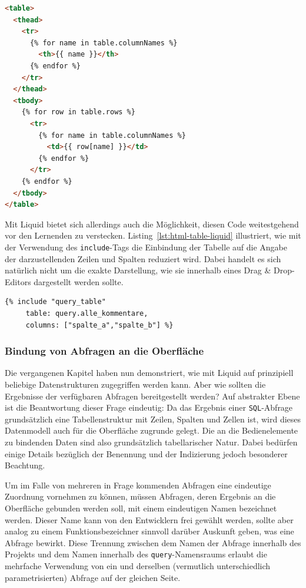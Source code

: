 \begin{lstlisting}[language=html,float=h,caption={Code für eine \texttt{HTML}-Tabelle mit Datenanbindung}, label={lst:html-table-pure}]
<table>
  <thead>
    <tr>
      {% for name in table.columnNames %}
        <th>{{ name }}</th>
      {% endfor %}
    </tr>
  </thead>
  <tbody>
    {% for row in table.rows %}
      <tr>
        {% for name in table.columnNames %}
          <td>{{ row[name] }}</td>
        {% endfor %}
      </tr>
    {% endfor %}
  </tbody>
</table>
\end{lstlisting}

Mit Liquid bietet sich allerdings auch die Möglichkeit, diesen Code weitestgehend vor den Lernenden zu verstecken. Listing~\ref{lst:html-table-liquid} illustriert, wie mit der Verwendung des \texttt{include}-Tags die Einbindung der Tabelle auf die Angabe der darzustellenden Zeilen und Spalten reduziert wird. Dabei handelt es sich natürlich nicht um die exakte Darstellung, wie sie innerhalb eines Drag \& Drop-Editors dargestellt werden sollte.

\begin{lstlisting}[language=html,float=h,caption={Code für eine Liquid-Tabelle mit Datenanbindung}, label={lst:html-table-liquid}]
{% include "query_table" 
     table: query.alle_kommentare,
     columns: ["spalte_a","spalte_b"] %}
\end{lstlisting}

\subsubsection{Bindung von Abfragen an die Oberfläche}
\label{sec:design-ui-bind-output}

Die vergangenen Kapitel haben nun demonstriert, wie mit Liquid auf prinzipiell beliebige Datenstrukturen zugegriffen werden kann. Aber wie sollten die Ergebnisse der verfügbaren Abfragen bereitgestellt werden? Auf abstrakter Ebene ist die Beantwortung dieser Frage eindeutig: Da das Ergebnis einer \texttt{SQL}-Abfrage grundsätzlich eine Tabellenstruktur mit Zeilen, Spalten und Zellen ist, wird dieses Datenmodell auch für die Oberfläche zugrunde gelegt. Die an die Bedienelemente zu bindenden Daten sind also grundsätzlich tabellarischer Natur. Dabei bedürfen einige Details bezüglich der Benennung und der Indizierung jedoch besonderer Beachtung.

Um im Falle von mehreren in Frage kommenden Abfragen eine eindeutige Zuordnung vornehmen zu können, müssen Abfragen, deren Ergebnis an die Oberfläche gebunden werden soll, mit einem eindeutigen Namen bezeichnet werden. Dieser Name kann von den Entwicklern frei gewählt werden, sollte aber analog zu einem Funktionsbezeichner sinnvoll darüber Auskunft geben, was eine Abfrage bewirkt. Diese Trennung zwischen dem Namen der Abfrage innerhalb des Projekts und dem Namen innerhalb des \texttt{query}-Namensraums erlaubt die mehrfache Verwendung von ein und derselben (vermutlich unterschiedlich parametrisierten) Abfrage auf der gleichen Seite.

